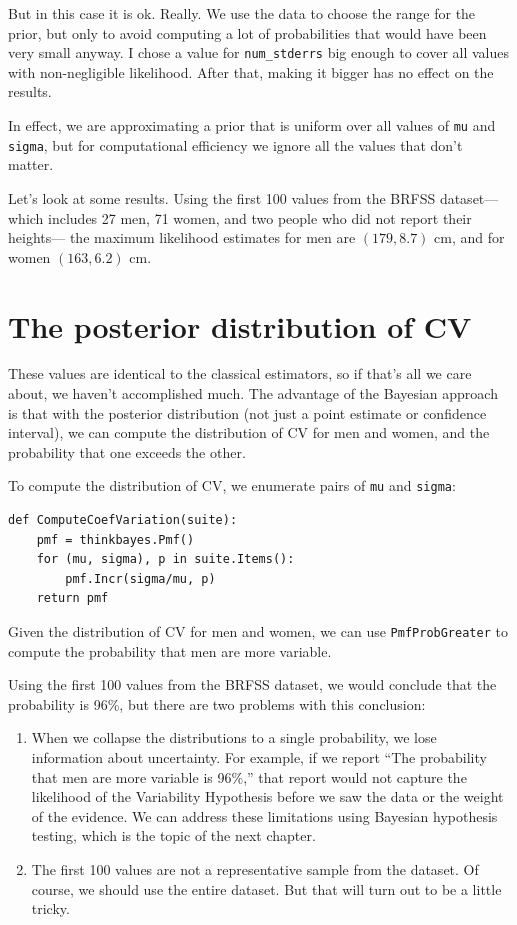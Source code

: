\documentclass[12pt]{book}
\begin{document}
But in this case it is ok.  Really.  We use the data to choose
the range for the prior, but only to avoid computing
a lot of probabilities that would have been very small anyway.
I chose a value for \verb"num_stderrs" big enough to
cover all values with non-negligible likelihood.  After that, making
it bigger has no effect on the results.

In effect, we are approximating a prior that is uniform over all values 
of {\tt mu} and {\tt sigma}, but for computational efficiency
we ignore all the values that don't matter.

Let's look at some results.  Using the first 100 values from the BRFSS
dataset---which includes 27 men, 71 women, and two people who did not
report their heights--- the maximum likelihood estimates for men are
$(179, 8.7)$ cm, and for women $(163, 6.2)$ cm.


\section{The posterior distribution of CV}

These values are identical to the classical estimators, so if that's
all we care about, we haven't accomplished much.  The advantage of the
Bayesian approach is that with the posterior distribution (not just a
point estimate or confidence interval), we can compute the
distribution of CV for men and women, and the probability that one
exceeds the other.

To compute the distribution of CV, we enumerate pairs of
{\tt mu} and {\tt sigma}:

\begin{verbatim}
def ComputeCoefVariation(suite):
    pmf = thinkbayes.Pmf()
    for (mu, sigma), p in suite.Items():
        pmf.Incr(sigma/mu, p)
    return pmf
\end{verbatim}

Given the distribution of
CV for men and women, we can use \verb"PmfProbGreater" to
compute the probability that
men are more variable.

Using the first 100 values from the BRFSS dataset, we would conclude
that the probability is 96\%, but there are two problems with
this conclusion:

\begin{enumerate}

\item When we collapse the distributions to a single probability, we
  lose information about uncertainty.  For example, if we report ``The
  probability that men are more variable is 96\%,'' that report would
  not capture the likelihood of the Variability Hypothesis before we
  saw the data or the weight of the evidence.  We can address these
  limitations using Bayesian hypothesis testing, which is the topic of
  the next chapter.

\item The first 100 values are not a representative sample from the
  dataset.  Of course, we should use the entire dataset.  But that
  will turn out to be a little tricky.

\end{enumerate}
\end{document}

